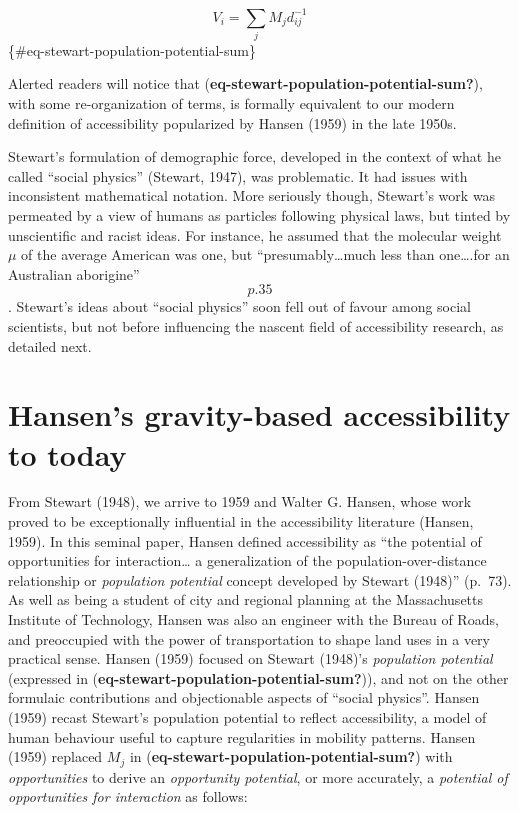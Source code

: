 \documentclass[
11pt, %
oneside, %
english, %
singlespacing, %
]{macthesis} %
\begin{document}
\[
V_i = \sum_j M_jd_{ij}^{-1}
\] \{\#eq-stewart-population-potential-sum\}

Alerted readers will notice that (\textbf{eq-stewart-population-potential-sum?}), with some re-organization of terms, is formally equivalent to our modern definition of accessibility popularized by Hansen (1959) in the late 1950s.

Stewart's formulation of demographic force, developed in the context of what he called ``social physics'' (Stewart, 1947), was problematic. It had issues with inconsistent mathematical notation. More seriously though, Stewart's work was permeated by a view of humans as particles following physical laws, but tinted by unscientific and racist ideas. For instance, he assumed that the molecular weight \(\mu\) of the average American was one, but ``presumably\ldots much less than one\ldots.for an Australian aborigine'' \[p. 35\]. Stewart's ideas about ``social physics'' soon fell out of favour among social scientists, but not before influencing the nascent field of accessibility research, as detailed next.

\section{Hansen's gravity-based accessibility to today}\label{grav-to-today}

From Stewart (1948), we arrive to 1959 and Walter G. Hansen, whose work proved to be exceptionally influential in the accessibility literature (Hansen, 1959). In this seminal paper, Hansen defined accessibility as ``the potential of opportunities for interaction\ldots{} a generalization of the population-over-distance relationship or \emph{population potential} concept developed by Stewart (1948)'' (p.~73). As well as being a student of city and regional planning at the Massachusetts Institute of Technology, Hansen was also an engineer with the Bureau of Roads, and preoccupied with the power of transportation to shape land uses in a very practical sense. Hansen (1959) focused on Stewart (1948)'s \emph{population potential} (expressed in (\textbf{eq-stewart-population-potential-sum?})), and not on the other formulaic contributions and objectionable aspects of ``social physics''. Hansen (1959) recast Stewart's population potential to reflect accessibility, a model of human behaviour useful to capture regularities in mobility patterns. Hansen (1959) replaced \(M_j\) in (\textbf{eq-stewart-population-potential-sum?}) with \emph{opportunities} to derive an \emph{opportunity potential}, or more accurately, a \emph{potential of opportunities for interaction} as follows:
\end{document}
